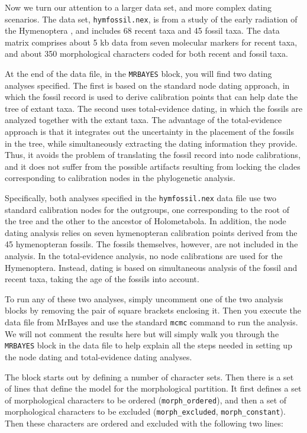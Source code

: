 \documentclass[12pt]{book}
\begin{document}
Now we turn our attention to a larger data set, and more complex dating scenarios. The data set,
\texttt{hymfossil.nex}, is from a study of the early radiation of the Hymenoptera
\citep{ronquist12b}, and includes 68 recent taxa and 45 fossil taxa. The data matrix comprises
about 5 kb data from seven molecular markers for recent taxa, and about 350 morphological
characters coded for both recent and fossil taxa.

At the end of the data file, in the \texttt{MRBAYES} block, you will find two dating analyses
specified. The first is based on the standard node dating approach, in which the fossil record is
used to derive calibration points that can help date the tree of extant taxa. The second uses
total-evidence dating, in which the fossils are analyzed together with the extant taxa. The
advantage of the total-evidence approach is that it integrates out the uncertainty in the placement
of the fossils in the tree, while simultaneously extracting the dating information they provide.
Thus, it avoids the problem of translating the fossil record into node calibrations, and it does
not suffer from the possible artifacts resulting from locking the clades corresponding to
calibration nodes in the phylogenetic analysis.

Specifically, both analyses specified in the \texttt{hymfossil.nex} data file use two standard
calibration nodes for the outgroups, one corresponding to the root of the tree and the other to the
ancestor of Holometabola. In addition, the node dating analysis relies on seven hymenopteran
calibration points derived from the 45 hymenopteran fossils. The fossils themselves, however, are
not included in the analysis. In the total-evidence analysis, no node calibrations are used for the
Hymenoptera. Instead, dating is based on simultaneous analysis of the fossil and recent taxa,
taking the age of the fossils into account.

To run any of these two analyses, simply uncomment one of the two analysis blocks by removing the
pair of square brackets enclosing it. Then you execute the data file from MrBayes and use the
standard \texttt{mcmc} command to run the analysis. We will not comment the results here but will
simply walk you through the \texttt{MRBAYES} block in the data file to help explain all the steps
needed in setting up the node dating and total-evidence dating analyses.

The block starts out by defining a number of character sets. Then there is a set of lines that
define the model for the morphological partition. It first defines a set of morphological
characters to be ordered (\texttt{morph\_ordered}), and then a set of morphological characters to
be excluded (\texttt{morph\_excluded}, \texttt{morph\_constant}). Then these characters are ordered
and excluded with the following two lines:
\end{document}
